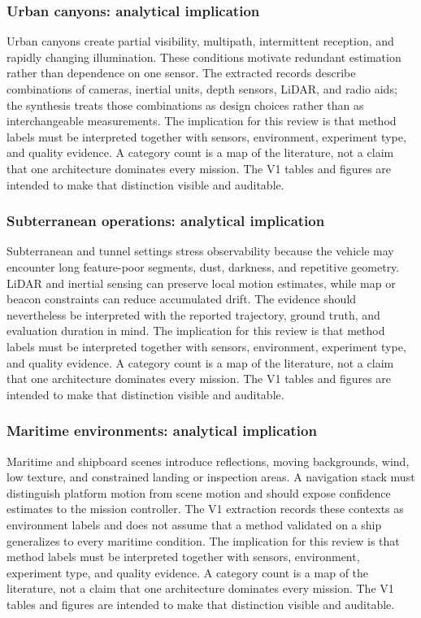 \documentclass[
  journal,
  10pt]{IEEEtran}
\begin{document}
\subsubsection{Urban canyons: analytical
implication}\label{urban-canyons-analytical-implication}

Urban canyons create partial visibility, multipath, intermittent
reception, and rapidly changing illumination. These conditions motivate
redundant estimation rather than dependence on one sensor. The extracted
records describe combinations of cameras, inertial units, depth sensors,
LiDAR, and radio aids; the synthesis treats those combinations as design
choices rather than as interchangeable measurements. The implication for
this review is that method labels must be interpreted together with
sensors, environment, experiment type, and quality evidence. A category
count is a map of the literature, not a claim that one architecture
dominates every mission. The V1 tables and figures are intended to make
that distinction visible and auditable.

\subsubsection{Subterranean operations: analytical
implication}\label{subterranean-operations-analytical-implication}

Subterranean and tunnel settings stress observability because the
vehicle may encounter long feature-poor segments, dust, darkness, and
repetitive geometry. LiDAR and inertial sensing can preserve local
motion estimates, while map or beacon constraints can reduce accumulated
drift. The evidence should nevertheless be interpreted with the reported
trajectory, ground truth, and evaluation duration in mind. The
implication for this review is that method labels must be interpreted
together with sensors, environment, experiment type, and quality
evidence. A category count is a map of the literature, not a claim that
one architecture dominates every mission. The V1 tables and figures are
intended to make that distinction visible and auditable.

\subsubsection{Maritime environments: analytical
implication}\label{maritime-environments-analytical-implication}

Maritime and shipboard scenes introduce reflections, moving backgrounds,
wind, low texture, and constrained landing or inspection areas. A
navigation stack must distinguish platform motion from scene motion and
should expose confidence estimates to the mission controller. The V1
extraction records these contexts as environment labels and does not
assume that a method validated on a ship generalizes to every maritime
condition. The implication for this review is that method labels must be
interpreted together with sensors, environment, experiment type, and
quality evidence. A category count is a map of the literature, not a
claim that one architecture dominates every mission. The V1 tables and
figures are intended to make that distinction visible and auditable.
\end{document}
